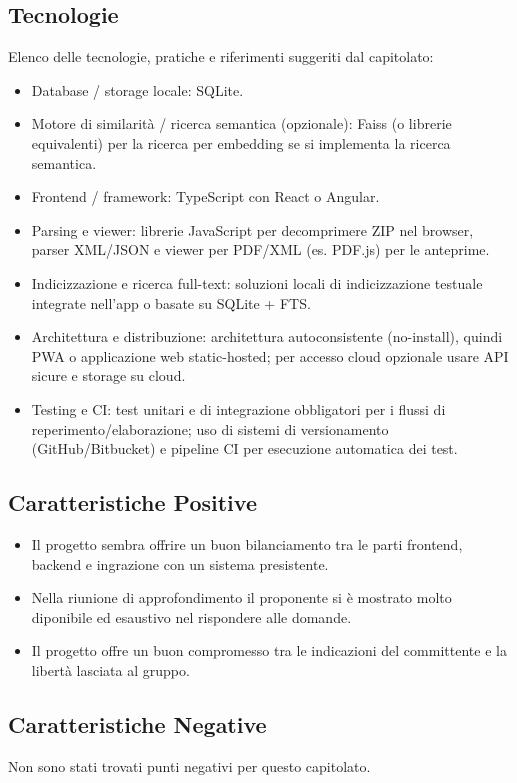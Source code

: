 \documentclass[a4paper,12pt]{article}
\begin{document}
    \subsection{Tecnologie}
    Elenco delle tecnologie, pratiche e riferimenti suggeriti dal capitolato:
    \begin{itemize}
        \item Database / storage locale: SQLite. 
        \item Motore di similarità / ricerca semantica (opzionale): Faiss (o librerie equivalenti) per la ricerca per embedding se si implementa la ricerca semantica. 
        \item Frontend / framework: TypeScript con React o Angular. 
        \item Parsing e viewer: librerie JavaScript per decomprimere ZIP nel browser, parser XML/JSON e viewer per PDF/XML (es. PDF.js) per le anteprime. 
        \item Indicizzazione e ricerca full-text: soluzioni locali di indicizzazione testuale integrate nell’app o basate su SQLite + FTS. 
        \item Architettura e distribuzione: architettura autoconsistente (no-install), quindi PWA o applicazione web static-hosted; per accesso cloud opzionale usare API sicure e storage su cloud. 
        \item Testing e CI: test unitari e di integrazione obbligatori per i flussi di reperimento/elaborazione; uso di sistemi di versionamento (GitHub/Bitbucket) e pipeline CI per esecuzione automatica dei test. 
    \end{itemize}

    \subsection{Caratteristiche Positive}
    \begin{itemize}
        \item Il progetto sembra offrire un buon bilanciamento tra le parti frontend, backend e ingrazione con un sistema presistente.
        \item Nella riunione di approfondimento il proponente si è mostrato molto diponibile ed esaustivo nel rispondere alle domande.
        \item Il progetto offre un buon compromesso tra le indicazioni del committente e la libertà lasciata al gruppo.
    \end{itemize}
    \subsection{Caratteristiche Negative}
    Non sono stati trovati punti negativi per questo capitolato.
\end{document}

